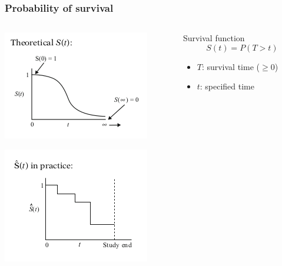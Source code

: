 \documentclass{beamer}
\begin{document}
\begin{frame}
  \frametitle{Probability of survival}

  \begin{columns}
    \begin{column}{0.5\textwidth} 
      \includegraphics[height = 0.4\textheight, width = \textwidth, keepaspectratio = true]{figure/ideal}

      \includegraphics[height = 0.4\textheight, width = \textwidth, keepaspectratio = true]{figure/prac}

      \tiny{}
    \end{column}
    \begin{column}{0.5\textwidth}
      \begin{block}{Survival function}
        \[
          S(t) = P(T > t)
        \]

        \begin{itemize}
          \item \(T\): survival time (\(\geq 0\))
          \item \(t\): specified time 
        \end{itemize}
      \end{block}
    \end{column}
  \end{columns}
\end{frame}
\end{document}
